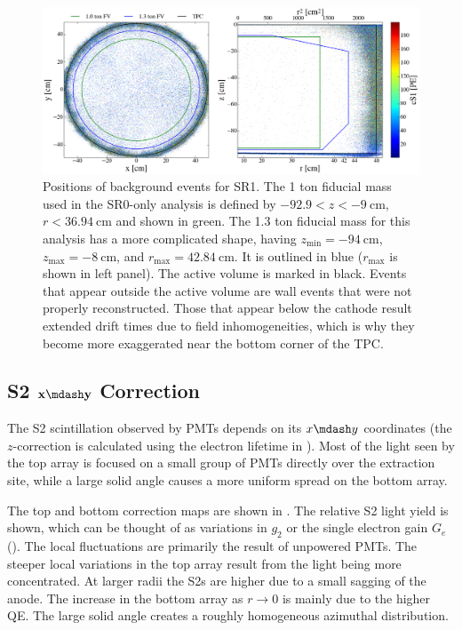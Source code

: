 \begin{figure}
\centering
\includegraphics[width=\textwidth]{FVBoth}
\caption{Positions of background events for SR1.  The 1 ton fiducial mass used in the SR0-only analysis is defined by
$-92.9 < z < -9\ \mathrm{cm}$, $r < 36.94\ \mathrm{cm}$ and shown in green.  The 1.3 ton fiducial mass for this analysis has a more
complicated shape, having $z_\mathrm{min} = -94\ \mathrm{cm}$,
$z_{\mathrm{max}} = -8\ \mathrm{cm}$, and $r_{\mathrm{max}} = 42.84\ \mathrm{cm}$.  It is outlined in blue ($r_{\mathrm{max}}$ is shown
in left panel).  The active volume is marked in black.  Events that appear outside the active volume are wall events that were not
properly
reconstructed.  Those that appear below the cathode result extended drift times due to field inhomogeneities, which is why they
become more exaggerated near the bottom corner of the TPC.}
\label{fig:calibrations_position_reconstruction}
\end{figure}



\subsection{S2 $\mathbf{x \mdash y}$ Correction}
\label{subsec:det_char_s2_position_correction}
The S2 scintillation observed by PMTs depends on its $x \mdash y$ coordinates (the $z$-correction is calculated using the electron
lifetime in ).  Most of the light seen by the top array is focused on a small group of PMTs directly
over the extraction site, while a large
solid angle causes a more uniform spread on the bottom array.

The top and bottom correction maps are shown in .  The relative S2 light yield is shown, which can be
thought of as variations in $g_2$ or the single electron gain $G_e$ ().  The local
fluctuations are primarily the result
of unpowered PMTs.  The steeper local variations in the top array result from the light being more concentrated.  At larger radii the
S2s are higher due to a small sagging of the anode.  The increase in the bottom array as $r \rightarrow 0$ is 
mainly due to the higher QE.  The large solid angle creates a roughly homogeneous azimuthal distribution.

